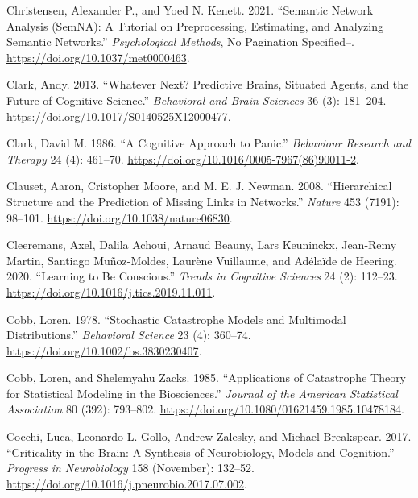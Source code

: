 \documentclass[
  a4paper,
  DIV=11,
  numbers=noendperiod,
  oneside]{scrreprt}
\newlength{\cslhangindent}
\newlength{\cslentryspacingunit} %
\newenvironment{CSLReferences}[2] %
 {%
  \setlength{\parindent}{0pt}
  \ifodd #1
  \let\oldpar\par
  \def\par{\hangindent=\cslhangindent\oldpar}
  \fi
  \setlength{\parskip}{#2\cslentryspacingunit}
 }%
 {}
\begin{document}
\begin{CSLReferences}{1}{0}
\leavevmode{}%
Christensen, Alexander P., and Yoed N. Kenett. 2021. {``Semantic Network
Analysis ({SemNA}): {A} Tutorial on Preprocessing, Estimating, and
Analyzing Semantic Networks.''} \emph{Psychological Methods}, No
Pagination Specified--. \url{https://doi.org/10.1037/met0000463}.

\leavevmode{}%
Clark, Andy. 2013. {``Whatever Next? {Predictive} Brains, Situated
Agents, and the Future of Cognitive Science.''} \emph{Behavioral and
Brain Sciences} 36 (3): 181--204.
\url{https://doi.org/10.1017/S0140525X12000477}.

\leavevmode{}%
Clark, David M. 1986. {``A Cognitive Approach to Panic.''}
\emph{Behaviour Research and Therapy} 24 (4): 461--70.
\url{https://doi.org/10.1016/0005-7967(86)90011-2}.

\leavevmode{}%
Clauset, Aaron, Cristopher Moore, and M. E. J. Newman. 2008.
{``Hierarchical Structure and the Prediction of Missing Links in
Networks.''} \emph{Nature} 453 (7191): 98--101.
\url{https://doi.org/10.1038/nature06830}.

\leavevmode{}%
Cleeremans, Axel, Dalila Achoui, Arnaud Beauny, Lars Keuninckx,
Jean-Remy Martin, Santiago Muñoz-Moldes, Laurène Vuillaume, and Adélaïde
de Heering. 2020. {``Learning to Be Conscious.''} \emph{Trends in
Cognitive Sciences} 24 (2): 112--23.
\url{https://doi.org/10.1016/j.tics.2019.11.011}.

\leavevmode{}%
Cobb, Loren. 1978. {``Stochastic Catastrophe Models and Multimodal
Distributions.''} \emph{Behavioral Science} 23 (4): 360--74.
\url{https://doi.org/10.1002/bs.3830230407}.

\leavevmode{}%
Cobb, Loren, and Shelemyahu Zacks. 1985. {``Applications of {Catastrophe
Theory} for {Statistical Modeling} in the {Biosciences}.''}
\emph{Journal of the American Statistical Association} 80 (392):
793--802. \url{https://doi.org/10.1080/01621459.1985.10478184}.

\leavevmode{}%
Cocchi, Luca, Leonardo L. Gollo, Andrew Zalesky, and Michael Breakspear.
2017. {``Criticality in the Brain: {A} Synthesis of Neurobiology, Models
and Cognition.''} \emph{Progress in Neurobiology} 158 (November):
132--52. \url{https://doi.org/10.1016/j.pneurobio.2017.07.002}.


\end{CSLReferences}
\end{document}
